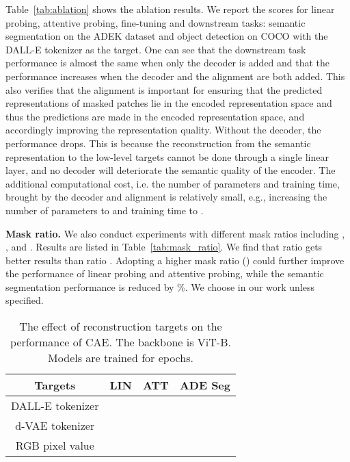 \documentclass[twocolumn]{svjour3}          \smartqed  \usepackage{graphicx}
\begin{document}
Table~\ref{tab:ablation} shows the ablation results.
We report the scores for 
linear probing,
attentive probing, fine-tuning
and downstream tasks: semantic segmentation on the ADEK dataset
and object detection on COCO
with the DALL-E tokenizer as the target.
One can see that 
the downstream task performance is almost the same
when only the decoder is added
and that the performance
increases
when the decoder and the alignment are both added.
This also verifies that
the alignment is important
for ensuring that
the predicted representations 
of masked patches
lie in the encoded representation space
and thus the predictions are made in the encoded representation space,
and accordingly improving the representation quality. 
Without the decoder, 
the performance drops. 
This is because the reconstruction from the semantic representation
to the low-level targets
cannot be done through a single linear layer,
and no decoder will deteriorate the semantic quality of the encoder.
The additional computational cost, i.e. the number of parameters and training time, brought by the decoder and alignment is relatively small, e.g., increasing the number of parameters to  and training time to .

\vspace{1mm}
\noindent \textbf{Mask ratio.}
We also conduct experiments with different mask ratios including , , and . Results are listed in Table~\ref{tab:mask_ratio}. We find that ratio  gets better results than ratio . Adopting a higher mask ratio () could further improve the performance of linear probing and attentive probing, while the semantic segmentation performance is reduced by \%. We choose  in our work unless specified.



\begin{table}[t]
  \centering
  \caption{The effect of reconstruction targets on the performance of CAE. The backbone is ViT-B. Models are trained for  epochs.} 
  \setlength{\tabcolsep}{11pt}
\renewcommand{\arraystretch}{1.1}
        \begin{tabular}{ c  c  c c }
            \toprule
            {Targets} & {LIN} & {ATT} & ADE Seg \\
              \hline
              DALL-E tokenizer &  & 		&  \\
              d-VAE tokenizer &  & 		&  \\
              RGB pixel value &  & 		&  \\
            \bottomrule
        \end{tabular} 
        \label{tab:abla_target}
\end{table}
\end{document}
